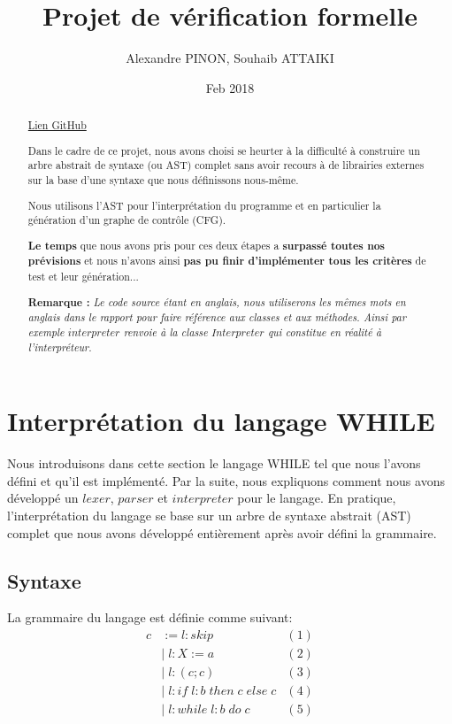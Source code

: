 \documentclass[a4paper]{article}
\title{Projet de vérification formelle}
\author{Alexandre PINON, Souhaib ATTAIKI}
\date{Feb 2018}
\begin{document}
\maketitle

\begin{abstract}

\href{https://github.com/souhaibattaiki/ivf-program-verifier}{Lien GitHub}

Dans le cadre de ce projet, nous avons choisi se heurter à la difficulté à construire un arbre abstrait de syntaxe (ou AST) complet sans avoir recours à de librairies externes sur la base d'une syntaxe que nous définissons nous-même. 

Nous utilisons l'AST pour l'interprétation du programme et en particulier la génération d'un graphe de contrôle (CFG). 

\textbf{Le temps} que nous avons pris pour ces deux étapes a \textbf{surpassé toutes nos prévisions} et nous n'avons ainsi \textbf{pas pu finir d'implémenter tous les critères} de test et leur génération...

\textbf{Remarque :}\textit{ Le code source étant en anglais, nous utiliserons les mêmes mots en anglais dans le rapport pour faire référence aux classes et aux méthodes. Ainsi par exemple $interpreter$ renvoie à la classe $Interpreter$ qui constitue en réalité à l'interpréteur.}
\end{abstract}

\tableofcontents

\newpage

\section{Interprétation du langage WHILE}

Nous introduisons dans cette section le langage WHILE tel que nous l'avons défini et qu'il est implémenté. Par la suite, nous expliquons comment nous avons développé un $lexer$, $parser$ et $interpreter$ pour le langage. En pratique, l'interprétation du langage se base sur un arbre de syntaxe abstrait (AST) complet que nous avons développé entièrement après avoir défini la grammaire. 

\subsection{Syntaxe} 

La grammaire du langage est définie comme suivant:
\begin{align*}
c & := l : skip & (1) \\ 
  & | \;  l : X := a & (2)\\
  & | \;  l : (c;c)  & (3)\\
  & | \;  l : if \; l : b \; then \; c \; else \; c & (4) \\ 
  & | \; l : while \; l : b \; do \;c & (5)
 \end{align*}
\end{document}
